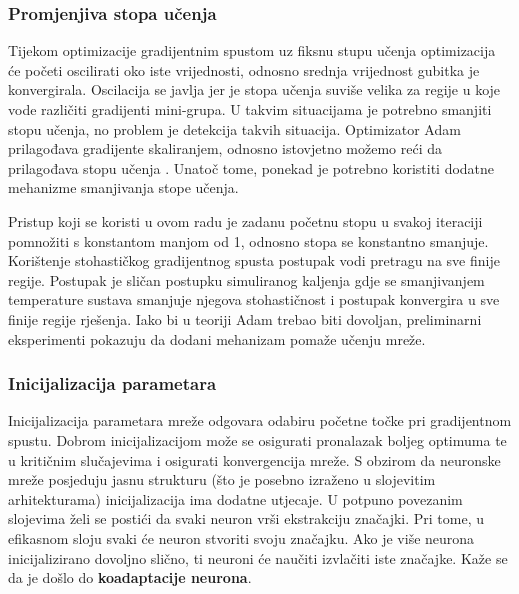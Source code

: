 \documentclass[times, utf8, numeric, diplomski]{fer}
\def\TODO#1{\noindent\textcolor{red}{TODO: \textit{#1}}\newline}
\def\todo#1{\TODO{#1}}
\begin{document}
\subsubsection{Promjenjiva stopa učenja}
Tijekom optimizacije gradijentnim spustom uz fiksnu stupu učenja optimizacija će početi oscilirati oko iste vrijednosti, odnosno srednja vrijednost gubitka je konvergirala. Oscilacija se javlja jer je stopa učenja suviše velika za regije u koje vode različiti gradijenti mini-grupa. U takvim situacijama je potrebno smanjiti stopu učenja, no problem je detekcija takvih situacija. Optimizator Adam prilagođava gradijente skaliranjem, odnosno istovjetno možemo reći da prilagođava stopu učenja \citep{goodfellowbook}. Unatoč tome, ponekad je potrebno koristiti dodatne mehanizme smanjivanja stope učenja.



Pristup koji se koristi u ovom radu je zadanu početnu stopu u svakoj iteraciji pomnožiti s konstantom manjom od 1, odnosno stopa se konstantno smanjuje. Korištenje stohastičkog gradijentnog spusta postupak vodi pretragu na sve finije regije. Postupak je sličan postupku simuliranog kaljenja gdje se smanjivanjem temperature sustava smanjuje njegova stohastičnost i postupak konvergira u sve finije regije rješenja. Iako bi u teoriji Adam trebao biti dovoljan, preliminarni eksperimenti pokazuju da dodani mehanizam pomaže učenju mreže.

\subsubsection{Inicijalizacija parametara}
Inicijalizacija parametara mreže odgovara odabiru početne točke pri gradijentnom spustu. Dobrom inicijalizacijom može se osigurati pronalazak boljeg optimuma te u kritičnim slučajevima i osigurati konvergencija mreže. S obzirom da neuronske mreže posjeduju jasnu strukturu (što je posebno izraženo u slojevitim arhitekturama) inicijalizacija ima dodatne utjecaje. U potpuno povezanim slojevima želi se postići da svaki neuron vrši ekstrakciju značajki. Pri tome, u efikasnom sloju svaki će neuron stvoriti svoju značajku. Ako je više neurona inicijalizirano dovoljno slično, ti neuroni će naučiti izvlačiti iste značajke. Kaže se da je došlo do \textbf{koadaptacije neurona}.
\end{document}
